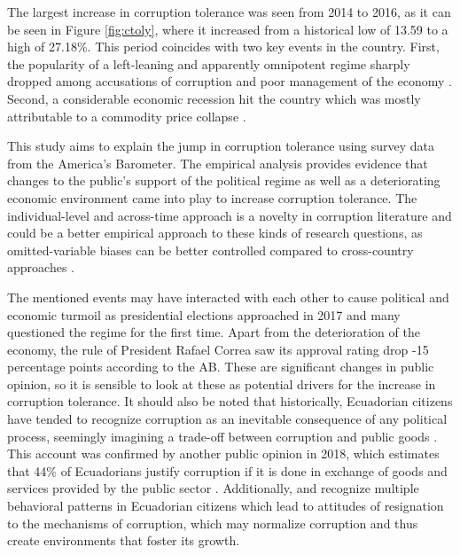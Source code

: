 \documentclass[12pt,a4]{article}\usepackage[]{graphicx}\usepackage[]{xcolor}
\begin{document}
The largest increase in corruption tolerance was seen from 2014 to 2016, as it can be seen in Figure \ref{fig:ctoly}, where it increased from a historical low of 13.59 to a high of 27.18\%. This period coincides with two key events in the country. First, the popularity of a left-leaning and apparently omnipotent regime sharply dropped among accusations of corruption and poor management of the economy \parencite{Quillupangui.2016}. Second, a considerable economic recession hit the country which was mostly attributable to a commodity price collapse \parencite{Weisbrot.2017}. 

This study aims to explain the jump in corruption tolerance using survey data from the America's Barometer. The empirical analysis provides evidence that changes to the public's support of the political regime as well as a deteriorating economic environment came into play to increase corruption tolerance. The individual-level and across-time approach is a novelty in corruption literature and could be a better empirical approach to these kinds of research questions, as omitted-variable biases can be better controlled compared to cross-country approaches \parencite{Bergh.2017}. 

The mentioned events may have interacted with each other to cause political and economic turmoil as presidential elections approached in 2017 and many questioned the regime for the first time. Apart from the deterioration of the economy, the rule of President Rafael Correa saw its approval rating drop -15 percentage points according to the AB. These are significant changes in public opinion, so it is sensible to look at these as potential drivers for the increase in corruption tolerance. It should also be noted that historically, Ecuadorian citizens have tended to recognize corruption as an inevitable consequence of any political process, seemingly imagining a trade-off between corruption and public goods \parencite{Adoum.2000}. This account was confirmed by another public opinion in 2018, which estimates that 44\% of Ecuadorians justify corruption if it is done in exchange of goods and services provided by the public sector \parencite{Loaiza.2019}. Additionally, \textcite{Hurtado.2007} and \textcite{Adoum.2000} recognize multiple behavioral patterns in Ecuadorian citizens which lead to attitudes of resignation to the mechanisms of corruption, which may normalize corruption and thus create environments that foster its growth. 
\end{document}
